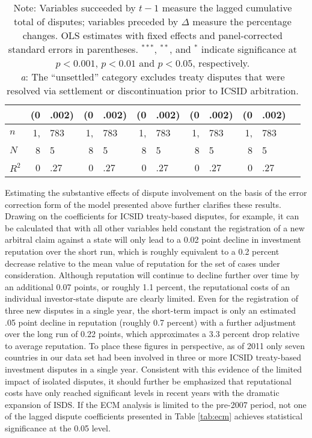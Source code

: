 \documentclass[12pt,onesided]{amsart}
\begin{document}
\begin{table}[ht]
{\begin{tabular}{lr@{} lr@{}lr@{}lr@{}lr@{}lr@{}}
  & (0&.002) & (0&.002) &  (0&.002) &  (0&.002) &  (0&.002) \\
	\hline
	$n$ & 1,&783 & 1,&783 & 1,&783 & 1,&783 & 1,&783 \\
	$N$ & 8&5 & 8&5 & 8&5 & 8&5 & 8&5 \\
	$R^{2}$ & 0&.27 & 0&.27 & 0&.27 & 0&.27 & 0&.27 \\
	\hline\hline
\end{tabular}
\caption*{Note: Variables succeeded by ${t-1}$ measure the lagged cumulative total of disputes; variables preceded by $\Delta$ measure the percentage changes. OLS estimates with fixed effects and panel-corrected standard errors in parentheses. $^{***}$, $^{**}$, and $^{*}$ indicate significance at $p<0.001$, $p<0.01$ and $p<0.05$, respectively. \\ \textit{a}: The ``unsettled'' category excludes treaty disputes that were resolved via settlement or discontinuation prior to ICSID arbitration.}
}
\end{table}


Estimating the substantive effects of dispute involvement on the basis of the error correction form of the model presented above further clarifies these results. Drawing on the coefficients for ICSID treaty-based disputes, for example, it can be calculated that with all other variables held constant the registration of a new arbitral claim against a state will only lead to a 0.02 point decline in investment reputation over the short run, which is roughly equivalent to a 0.2 percent decrease relative to the mean value of reputation for the set of cases under consideration. Although reputation will continue to decline further over time by an additional 0.07 points, or roughly 1.1 percent, the reputational costs of an individual investor-state dispute are clearly limited. Even for the registration of three new disputes in a single year, the short-term impact is only an estimated .05 point decline in reputation (roughly 0.7 percent) with a further adjustment over the long run of 0.22 points, which approximates a 3.3 percent drop relative to average reputation. To place these figures in perspective, as of 2011 only seven countries in our data set had been involved in three or more ICSID treaty-based investment disputes in a single year. Consistent with this evidence of the limited impact of isolated disputes, it should further be emphasized that reputational costs have only reached significant levels in recent years with the dramatic expansion of ISDS. If the ECM analysis is limited to the pre-2007 period, not one of the lagged dispute coefficients presented in Table \ref{tab:ecm} achieves statistical significance at the 0.05 level. 
\end{document}

